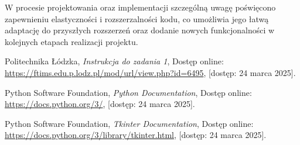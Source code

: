\documentclass{article}
\begin{document}
    W procesie projektowania oraz implementacji szczególną uwagę poświęcono zapewnieniu 
    elastyczności i rozszerzalności kodu, co umożliwia jego łatwą adaptację do przyszłych 
    rozszerzeń oraz dodanie nowych funkcjonalności w kolejnych etapach realizacji projektu.
    


\begin{thebibliography}{9}

    Politechnika Łódzka, 
    \emph{Instrukcja do zadania 1}, 
    Dostęp online: \url{https://ftims.edu.p.lodz.pl/mod/url/view.php?id=6495}, 
    [dostęp: 24 marca 2025].


    Python Software Foundation, 
    \emph{Python Documentation}, 
    Dostęp online: \url{https://docs.python.org/3/}, 
    [dostęp: 24 marca 2025].

    Python Software Foundation, 
    \emph{Tkinter Documentation}, 
    Dostęp online: \url{https://docs.python.org/3/library/tkinter.html}, 
    [dostęp: 24 marca 2025].

\end{thebibliography}
\end{document}
